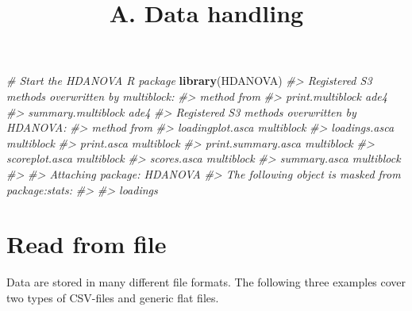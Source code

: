 \documentclass[
]{article}
\title{A. Data handling}
\author{}
\date{\vspace{-2.5em}}
\newenvironment{Shaded}{\begin{snugshade}}{\end{snugshade}}
\newcommand{\CommentTok}[1]{\textcolor[rgb]{0.56,0.35,0.01}{\textit{#1}}}
\newcommand{\FunctionTok}[1]{\textcolor[rgb]{0.13,0.29,0.53}{\textbf{#1}}}
\newcommand{\NormalTok}[1]{#1}
\begin{document}
\maketitle

\begin{Shaded}
\begin{Highlighting}[]
\CommentTok{\# Start the HDANOVA R package}
\FunctionTok{library}\NormalTok{(HDANOVA)}
\CommentTok{\#\textgreater{} Registered S3 methods overwritten by \textquotesingle{}multiblock\textquotesingle{}:}
\CommentTok{\#\textgreater{}   method             from}
\CommentTok{\#\textgreater{}   print.multiblock   ade4}
\CommentTok{\#\textgreater{}   summary.multiblock ade4}
\CommentTok{\#\textgreater{} Registered S3 methods overwritten by \textquotesingle{}HDANOVA\textquotesingle{}:}
\CommentTok{\#\textgreater{}   method             from      }
\CommentTok{\#\textgreater{}   loadingplot.asca   multiblock}
\CommentTok{\#\textgreater{}   loadings.asca      multiblock}
\CommentTok{\#\textgreater{}   print.asca         multiblock}
\CommentTok{\#\textgreater{}   print.summary.asca multiblock}
\CommentTok{\#\textgreater{}   scoreplot.asca     multiblock}
\CommentTok{\#\textgreater{}   scores.asca        multiblock}
\CommentTok{\#\textgreater{}   summary.asca       multiblock}
\CommentTok{\#\textgreater{} }
\CommentTok{\#\textgreater{} Attaching package: \textquotesingle{}HDANOVA\textquotesingle{}}
\CommentTok{\#\textgreater{} The following object is masked from \textquotesingle{}package:stats\textquotesingle{}:}
\CommentTok{\#\textgreater{} }
\CommentTok{\#\textgreater{}     loadings}
\end{Highlighting}
\end{Shaded}

\hypertarget{read-from-file}{%
\section{Read from file}\label{read-from-file}}

Data are stored in many different file formats. The following three
examples cover two types of CSV-files and generic flat files.
\end{document}
